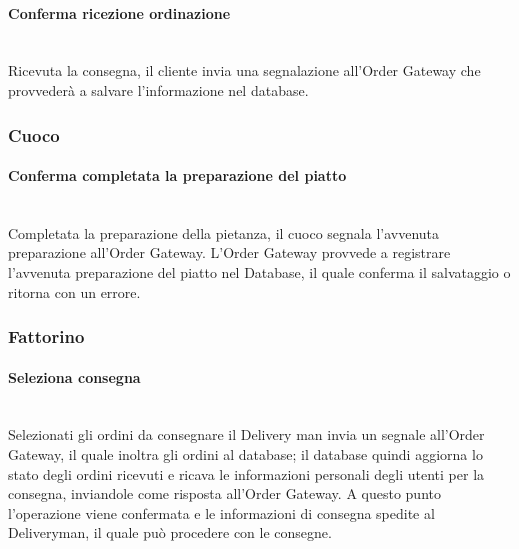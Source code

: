 \paragraph{Conferma ricezione ordinazione}\mbox{}\\
Ricevuta la consegna, il cliente invia una segnalazione all’Order Gateway che provvederà a salvare l'informazione nel database.

\subsubsection{Cuoco}

\paragraph{Conferma completata la preparazione del piatto}\mbox{}\\
Completata la preparazione della pietanza, il cuoco segnala l’avvenuta preparazione all’Order Gateway. L’Order Gateway provvede a registrare l’avvenuta preparazione del piatto nel Database, il quale conferma il salvataggio o ritorna con un errore.

\subsubsection{Fattorino}

\paragraph{Seleziona consegna}\mbox{}\\
Selezionati gli ordini da consegnare il Delivery man invia un segnale all’Order Gateway, il quale inoltra gli ordini al database; il database quindi aggiorna lo stato degli ordini ricevuti e ricava le informazioni personali degli utenti per la consegna, inviandole come risposta all’Order Gateway. A questo punto l’operazione viene confermata e le informazioni di consegna spedite al Deliveryman, il quale può procedere con le consegne.

